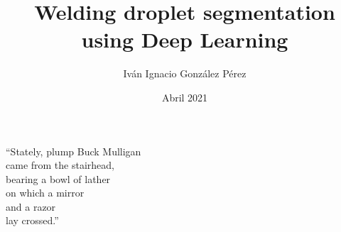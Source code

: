 \documentclass[upright, contnum]{Config/umemoria}
\author{Iván Ignacio González Pérez}
\title{Welding droplet segmentation using Deep Learning}
\date{Abril 2021}
\begin{document}
\frontmatter
\maketitle





\begin{dedicatoria} %
“Stately, plump Buck Mulligan\\came from the stairhead,\\bearing a bowl of lather\\on which a mirror\\and a razor\\lay crossed.”
\end{dedicatoria}

\begin{thanks} %

\end{thanks}

\tableofcontents
\listoftables %
\listoffigures %

\mainmatter














\appendix


\end{document}
